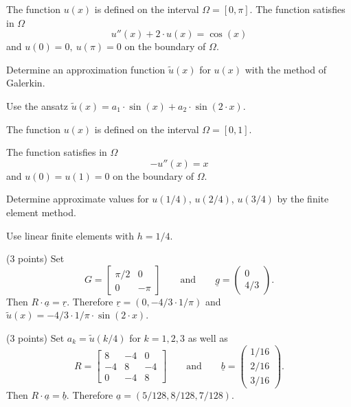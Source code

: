 \begin{teilaufgaben}
\item
The function $u(x)$ is defined on the interval $\Omega = [0, \pi]$.
The function satisfies in $\Omega$ 
\[
u''(x) + 2 \cdot u(x) = \cos(x)
\]
and $u(0) = 0, \  u(\pi) = 0$ on the boundary of $\Omega$. 

Determine an approximation function $\tilde u(x)$ for $u(x)$ with the
method of Galerkin.

Use the ansatz $\tilde u(x) = a_1 \cdot \sin(x) + a_2 \cdot \sin(2 \cdot x)$.

\item
The function $u(x)$ is defined on the interval $\Omega = [0, 1].$

The function satisfies in $\Omega$ 
\[
-u''(x) = x
\]
and $u(0) = u(1) = 0$ on the boundary of $\Omega$. 

Determine approximate values for $u(1/4)$, $u(2/4)$, $u(3/4)$ by the
finite element method. 

Use linear finite elements with $h = 1/4$.
\end{teilaufgaben}

\begin{loesung}
\begin{teilaufgaben}
\item
(3 points)
Set
\[
G
=
\left[\begin{array}{cc}
\pi/2 & 0  \\
0 & - \pi
\end{array}\right]
\qquad\text{and}\qquad
\underline{g}
=
\left(\begin{array}{c} 0 \\ 4/3 \end{array}\right).
\]
Then $R \cdot \underline{a} = \underline{r}$.
Therefore $\underline{r} = (0, - 4/3 \cdot 1/\pi)$ and
$\tilde u(x) = -4/3 \cdot 1/\pi \cdot \sin(2 \cdot x) $.

\item
(3 points)
Set $a_k = \tilde u(k/4)$ for $k = 1,2,3$ as well as
\[
R =
\left[\begin{array}{rrr}
8 & -4 & 0  \\
-4 & 8 & - 4 \\
0 & -4 & 8
\end{array}\right]
\qquad\text{and}\qquad
\underline{b} =
\left(\begin{array}{r} 1/16 \\ 2/16 \\ 3/16 \end{array}\right).
\]
Then $R \cdot \underline{a} = \underline{b}$.
Therefore $\underline{a} = (5/128, 8/128, 7/128)$.
\qedhere
\end{teilaufgaben}
\end{loesung}
